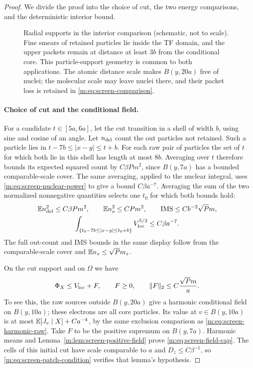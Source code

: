 \begin{proof}
We divide the proof into the choice of cut, the two energy comparisons,
and the deterministic interior bound.


\begin{figure}[htbp]
 \centering
 
 \caption{Radial supports in the interior comparison (schematic, not to
 scale). Fine smears of retained particles lie inside the TF domain,
 and the upper packets remain at distance at least $3b$ from the
 conditional core. This particle-support geometry is common to both
 applications. The atomic distance scale makes $B(y,20a)$ free of
 nuclei; the molecular scale may leave nuclei there, and their packet
 loss is retained in \eqref{m:eq:screen-comparison}.}
 \label{m:fig:screen-patch}
\end{figure}

\paragraph{Choice of cut and the conditional field.}
For a candidate $t\in[5a,6a]$, let the cut transition in a shell of
width $b$, using sine and cosine of an angle.  Let $n_{\rm del}$ count
the out particles not retained.  Such a particle lies in
$t-7b\le|x-y|\le t+b$.  For each raw pair of particles the set of
$t$ for which both lie in this shell has length at most $8b$.
Averaging over $t$ therefore bounds its expected squared count by
$C\beta Pm^2$, since $B(y,7a)$ has a bounded comparable-scale cover.
The same averaging, applied to the nuclear integral, uses
\eqref{m:eq:screen-nuclear-power} to give a bound $C\beta a^{-7}$.
Averaging the sum of the two normalized nonnegative quantities selects
one $t_0$ for which both bounds hold:
\begin{equation}\label{m:eq:screen-deleted-shell}
 \begin{gathered}
 \mathbb E n_{\rm del}^2\le C\beta Pm^2,\qquad
 \mathbb E n_o^2\le CPm^2,\qquad
 \mathrm{IMS}\le Cb^{-2}\sqrt Pm,\\
 \int_{\{t_0-7b\le|x-y|\le t_0+b\}}V_{\rm loc}^{5/2}
       \le C\beta a^{-7}.
 \end{gathered}
\end{equation}
The full out-count and IMS bounds in the same display follow from
the comparable-scale cover and $\mathbb E n_z\le\sqrt Pm_z$.

On the cut support and on $\Omega$ we have
\begin{equation}\label{m:eq:screen-field-cap}
 \Phi_X\le V_{\rm loc}+F,\qquad F\ge0,\qquad
 \|F\|_2\le C\frac{\sqrt Pm}{a}.
\end{equation}
To see this, the raw sources outside $B(y,20a)$ give a harmonic
conditional field on $B(y,10a)$; these electrons are all core particles.
Its value at $v\in B(y,10a)$ is at most
$\mathbb E[J_v\mid X]+Ca^{-4}$, by the same exclusion comparison as
\eqref{m:eq:screen-harmonic-raw}.  Take $F$ to be the positive supremum
on $B(y,7a)$.  Harmonic means and
Lemma~\ref{m:lem:screen-positive-field} prove \eqref{m:eq:screen-field-cap}.
The cells of this initial cut have scale comparable to $a$ and
$D_z\le C\beta^{-1}$, so \eqref{m:eq:screen-patch-condition} verifies
that lemma's hypothesis.


\end{proof}
